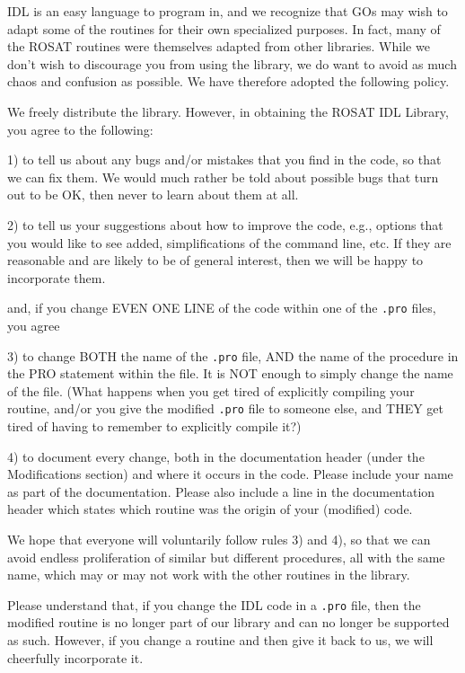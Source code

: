 IDL is an easy language to program in, and we recognize that GOs may wish
to adapt some of the routines for their own specialized purposes. In fact,
many of the ROSAT routines were themselves adapted from other libraries.
While we don't wish to discourage you from using the library, we do want
to avoid as much chaos and confusion as possible. We have therefore adopted
the following policy.
 
We freely distribute the library. However, in obtaining the ROSAT IDL
Library, you agree to the following:
 
1) to tell us about any bugs and/or mistakes that you find in the code, so
that we can fix them. We would much rather be told about possible bugs that
turn out to be OK, then never to learn about them at all.
 
2) to tell us your suggestions about how to improve the code, e.g., options
that you would like to see added, simplifications of the command line, etc.
If they are reasonable and are likely to be of general interest, then we
will be happy to incorporate them.
 
and, if you change EVEN ONE LINE of the code within one of the {\tt .pro} files,
you agree
 
3) to change BOTH the name of the {\tt .pro} file, AND the name of the procedure
in the PRO statement within the file. It is NOT enough to simply change the
name of the file. (What happens when you get tired of explicitly compiling
your routine, and/or you give the modified {\tt .pro} file to someone else, and
THEY get tired of having to remember to explicitly compile it?)
 
4) to document every change, both in the documentation header (under the
Modifications section) and where it occurs in the code. Please include
your name as part of the documentation. Please also include a line in the
documentation header which states which routine was the origin of your
(modified) code.
 
We hope that everyone will voluntarily follow rules 3) and 4), so that we
can avoid endless proliferation of similar but different procedures, all
with the same name, which may or may not work with the other routines in
the library.
 
Please understand that, if you change the IDL code in a {\tt .pro} file, then the
modified routine is no longer part of our library and can no longer be
supported as such.  However, if you change a routine and then give it back to
us, we will cheerfully incorporate it.
 

